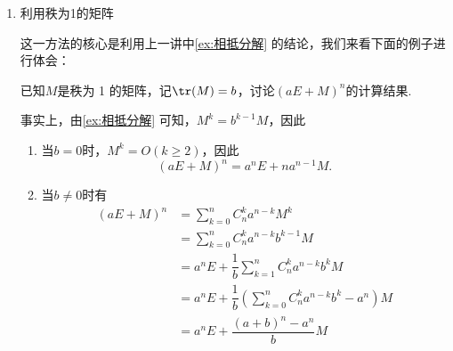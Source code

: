 \begin{enumerate}
    \item 利用秩为1的矩阵

          这一方法的核心是利用上一讲中\autoref{ex:相抵分解} 的结论，我们来看下面的例子进行体会：
          \begin{example}{}{}
              已知$M$是秩为 1 的矩阵，记$\tr(M)=b$，讨论$(aE+M)^n$的计算结果.
          \end{example}
          \begin{solution}
              事实上，由\autoref{ex:相抵分解} 可知，$M^k=b^{k-1}M$，因此
              \begin{enumerate}
                  \item 当$b=0$时，$M^k=O(k\geqslant 2)$，因此
                        \[(aE+M)^n=a^nE+na^{n-1}M.\]

                  \item 当$b\neq 0$时有
                        \begin{align*}
                            (aE+M)^n & =\sum_{k=0}^nC_n^ka^{n-k}M^k                                    \\
                                     & =\sum_{k=0}^nC_n^ka^{n-k}b^{k-1}M                               \\
                                     & =a^nE+\dfrac{1}{b}\sum_{k=1}^nC_n^ka^{n-k}b^kM                  \\
                                     & =a^nE+\dfrac{1}{b}\left(\sum_{k=0}^nC_n^ka^{n-k}b^k-a^n\right)M \\
                                     & =a^nE+\dfrac{(a+b)^n-a^n}{b}M
                        \end{align*}
              \end{enumerate}
          \end{solution}


\end{enumerate}
